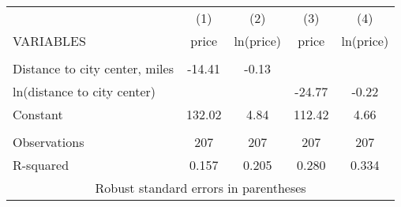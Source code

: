 \begin{tabular}{lcccc} \hline
 & (1) & (2) & (3) & (4) \\
VARIABLES & price & ln(price) & price & ln(price) \\ \hline
 &  &  &  &  \\
Distance to city center, miles & -14.41 & -0.13 &  &  \\
ln(distance to city center) &  &  & -24.77 & -0.22 \\
Constant & 132.02 & 4.84 & 112.42 & 4.66 \\
 &  &  &  &  \\
Observations & 207 & 207 & 207 & 207 \\
 R-squared & 0.157 & 0.205 & 0.280 & 0.334 \\ \hline
\multicolumn{5}{c}{ Robust standard errors in parentheses} \\
\end{tabular}

